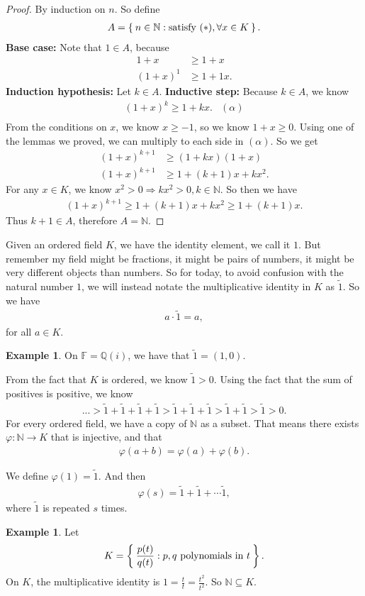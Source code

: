 \documentclass[12pt]{amsbook}
\theoremstyle{plain}
\numberwithin{section}{chapter}
\numberwithin{equation}{chapter}
\theoremstyle{definition}
\newtheorem{Ex}[theorem]{Example}
\theoremstyle{remark}
\theoremstyle{plain}
\newcommand{\sub}{\subseteq}
\newcommand{\n}{\mathbb{N}}
\newcommand{\Q}{\mathbb{Q}}
\newcommand{\F}{\mathbb{F}}
\newcommand{\bee}{\begin{equation}\begin{aligned}}
\newcommand{\eee}{\end{aligned}\end{equation}}
\newcommand{\fracc}{\frac}
\renewcommand{\geq}{\geqslant}
\renewcommand{\phi}{\varphi}
\begin{document}
\begin{proof}
By induction on $n$. So define
\bee
A = \Set{n \in \n: \text{satisfy }(*),\forall x \in K}. 
\eee
\textbf{Base case: }Note that $1 \in A$, because 
\bee
1 + x &\geq 1 + x\\
(1 + x)^1 &\geq 1 + 1x.
\eee
\textbf{Induction hypothesis:} Let $k \in A$. 
\textbf{Inductive step:} Because $k \in A$, we know
\bee
(1 + x)^k \geq 1 + kx. & (\alpha)\\
\eee
From the conditions on $x$, we know $x \geq -1$, so we know $1 + x \geq 0$. Using one of the lemmas we proved, we can multiply to each side in $(\alpha)$. So we get
\bee
(1 + x)^{k + 1} &\geq (1 + kx)(1 + x)\\
(1 + x)^{k + 1} &\geq 1 + (k + 1)x + kx^2.
\eee
For any $x \in K$, we know $x^2 > 0 \Rightarrow kx^2 > 0, k \in \n$. So then we have
\bee
(1 + x)^{k + 1} \geq 1 + (k + 1)x + kx^2 \geq 1 + (k + 1)x.
\eee
Thus $k + 1 \in A$, therefore $A = \n$. 
\end{proof}

Given an ordered field $K$, we have the identity element, we call it $1$. But remember my field might be fractions, it might be pairs of numbers, it might be very different objects than numbers. So for today, to avoid confusion with the natural number $1$, we will instead notate the multiplicative identity in $K$ as $\tilde{1}$. So we have
\bee
a \cdot \tilde{1} = a,
\eee
for all $a \in K$. 

\begin{Ex}
On $\F = \Q(i)$, we have that $\tilde{1} = (1,0)$. 
\end{Ex}

From the fact that $K$ is ordered, we know  $\tilde{1} > 0$. Using the fact that the sum of positives is positive, we know
\bee
... > \tilde{1} + \tilde{1} + \tilde{1} + \tilde{1} > \tilde{1} + \tilde{1} + \tilde{1} > \tilde{1} + \tilde{1} > \tilde{1} > 0.
\eee
For every ordered field, we have a copy of $\n$ as a subset. That means there exists $\phi:\n \to K$ that is injective, and that 
\bee
\phi(a + b) = \phi(a) + \phi(b).
\eee

We define $\phi(1) = \tilde{1}$. And then
\bee
\phi(s) = \tilde{1} + \tilde{1} + \cdots \tilde{1},
\eee
where $\tilde{1}$ is repeated $s$ times. 

\begin{Ex}
Let
\bee
K = \Set{\fracc{p(t)}{q(t)}:p,q \text{ polynomials in }t }. 
\eee
On $K$, the multiplicative identity is $1 = \fracc{t}{t} = \fracc{t^2}{t^2}$. So $\n \sub K$. 
\end{Ex}
\end{document}
